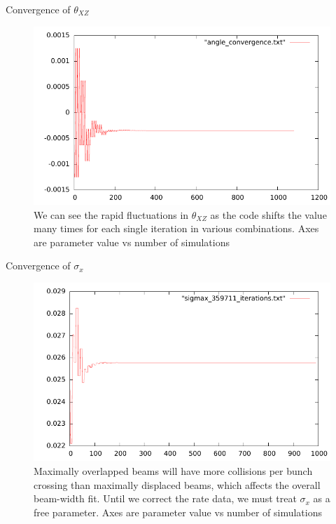 \begin{frame}{Convergence of $\theta_{XZ}$ }
\begin{figure}
\begin{center}
\includegraphics[width=0.8\linewidth]{../RootFinding/figs/angle.pdf}
\end{center}
\caption{We can see the rapid fluctuations in $\theta_{XZ}$ as the code shifts
the value many times for each single iteration in various combinations. Axes are
parameter value vs number of simulations}
\label{fig:angle_359711_convergence}
\end{figure}
\end{frame}


\begin{frame}{Convergence of $\sigma_{x}$ }
\begin{figure}
\begin{center}
\includegraphics[width=0.8\linewidth]{../RootFinding/figs/sigmax_359711_convergence.pdf}
\end{center}
\caption{ 
Maximally overlapped beams will have more collisions per bunch crossing than
maximally displaced beams, which affects the overall beam-width fit. Until we
correct the rate data, we must treat $\sigma_{x}$ as a free parameter. Axes are
parameter value vs number of
simulations}
\label{fig:sigmax_359711_convergence}
\end{figure}
\end{frame}

